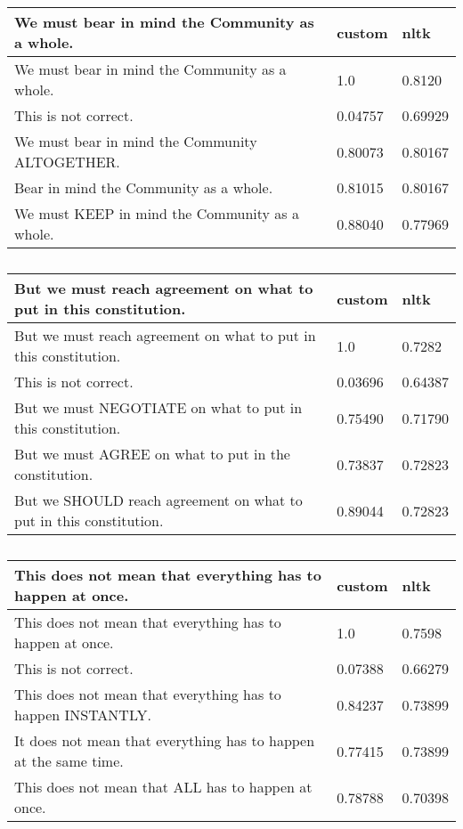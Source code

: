 \documentclass[a4paper,landscape]{article}
\begin{document}
\begin{table}
  \begin{tabular}{l l l}
    \toprule
    We must bear in mind the Community as a whole. & custom & nltk \\
    \midrule
    We must bear in mind the Community as a whole. & 1.0 & 0.8120 \\
    This is not correct. & 0.04757 & 0.69929 \\
    We must bear in mind the Community ALTOGETHER. & 0.80073 & 0.80167 \\
    Bear in mind the Community as a whole. & 0.81015 & 0.80167 \\
    We must KEEP in mind the Community as a whole. & 0.88040 & 0.77969 \\
    \bottomrule
  \end{tabular}
  \caption{}
\end{table}
    

\begin{table}
  \begin{tabular}{l l l}
    \toprule
    But we must reach agreement on what to put in this constitution. & custom & nltk \\
    \midrule
    But we must reach agreement on what to put in this constitution. & 1.0 & 0.7282\\
    This is not correct. & 0.03696 & 0.64387 \\
    But we must NEGOTIATE on what to put in this constitution. & 0.75490 & 0.71790 \\
    But we must AGREE on what to put in the constitution. & 0.73837 & 0.72823 \\
    But we SHOULD reach agreement on what to put in this constitution. & 0.89044 & 0.72823 \\
    \bottomrule
  \end{tabular}
  \caption{}
\end{table}

\begin{table}
  \begin{tabular}{l l l}
    \toprule
    This does not mean that everything has to happen at once. & custom & nltk \\
    \midrule
    This does not mean that everything has to happen at once. & 1.0 & 0.7598 \\
    This is not correct. & 0.07388 & 0.66279 \\
    This does not mean that everything has to happen INSTANTLY. & 0.84237 & 0.73899 \\
    It does not mean that everything has to happen at the same time. & 0.77415 & 0.73899 \\
    This does not mean that ALL has to happen at once. & 0.78788 & 0.70398 \\
    \bottomrule
  \end{tabular}
  \caption{}
\end{table}
\end{document}
